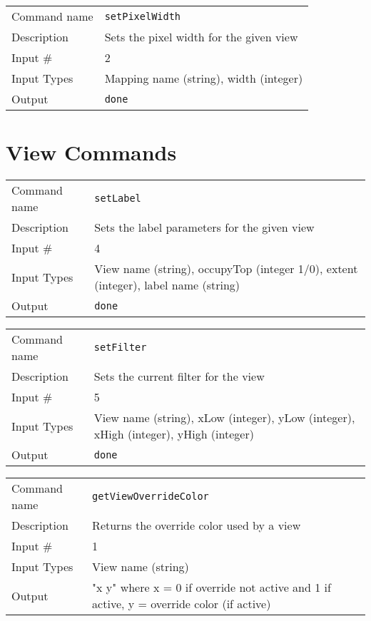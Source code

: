 \noindent
\begin{tabular}{l|p{5in}}
\hline
Command name & {\tt setPixelWidth} \\
Description  & Sets the pixel width for the given view \\
Input \#     & 2 \\
Input Types  & Mapping name (string), width (integer) \\
Output       & {\tt done} \\
\hline
\end{tabular}

\section{View Commands}

\noindent
\begin{tabular}{l|p{5in}}
\hline
Command name & {\tt setLabel} \\
Description  & Sets the label parameters for the given view \\
Input \#     & 4 \\
Input Types  & View name (string), occupyTop (integer 1/0),
               extent (integer), label name (string) \\
Output       & {\tt done} \\
\hline
\end{tabular}

\bigskip

\noindent
\begin{tabular}{l|p{5in}}
\hline
Command name & {\tt setFilter} \\
Description  & Sets the current filter for the view \\
Input \#     & 5 \\
Input Types  & View name (string), xLow (integer), yLow (integer),
               xHigh (integer), yHigh (integer) \\
Output       & {\tt done} \\
\hline
\end{tabular}

\bigskip

\noindent
\begin{tabular}{l|p{5in}}
\hline
Command name & {\tt getViewOverrideColor} \\
Description  & Returns the override color used by a view \\
Input \#     & 1 \\
Input Types  & View name (string) \\
Output       & "x y" where x = 0 if override not active and 1 if active,
               y = override color (if active) \\
\hline
\end{tabular}

